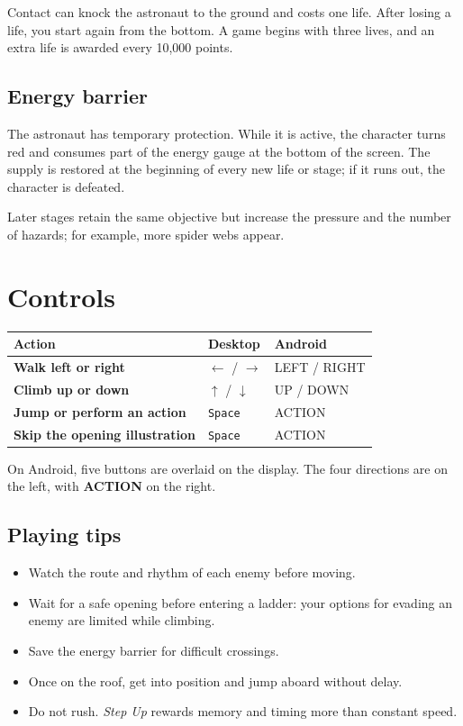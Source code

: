 \documentclass[11pt,a4paper]{article}
\newcommand{\keycap}[1]{%
  \begingroup
  \setlength{\fboxsep}{3pt}%
  \colorbox{softgray}{\texttt{#1}}%
  \endgroup
}
\begin{document}
Contact can knock the astronaut to the ground and costs one life. After losing
a life, you start again from the bottom. A game begins with three lives, and
an extra life is awarded every 10,000 points.

\subsection{Energy barrier}

The astronaut has temporary protection. While it is active, the character
turns red and consumes part of the energy gauge at the bottom of the screen.
The supply is restored at the beginning of every new life or stage; if it runs
out, the character is defeated.

Later stages retain the same objective but increase the pressure and the
number of hazards; for example, more spider webs appear.

\section{Controls}

\begin{center}
\begin{tabularx}{\textwidth}{>{\bfseries}p{}XX}
\toprule
Action & Desktop & Android \\
\midrule
Walk left or right & \keycap{$\leftarrow$} / \keycap{$\rightarrow$} & LEFT / RIGHT \\
Climb up or down & \keycap{$\uparrow$} / \keycap{$\downarrow$} & UP / DOWN \\
Jump or perform an action & \keycap{Space} & ACTION \\
Skip the opening illustration & \keycap{Space} & ACTION \\
\bottomrule
\end{tabularx}
\end{center}

On Android, five buttons are overlaid on the display. The four directions are
on the left, with \textbf{ACTION} on the right.

\subsection{Playing tips}

\begin{itemize}
  \item Watch the route and rhythm of each enemy before moving.
  \item Wait for a safe opening before entering a ladder: your options for
        evading an enemy are limited while climbing.
  \item Save the energy barrier for difficult crossings.
  \item Once on the roof, get into position and jump aboard without delay.
  \item Do not rush. \textit{Step Up} rewards memory and timing more than
        constant speed.
\end{itemize}
\end{document}
